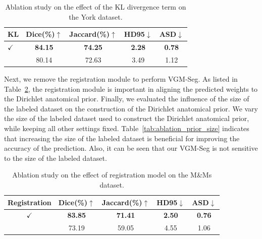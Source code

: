 \documentclass[preprint,12pt]{elsarticle}
\begin{document}
\begin{table}[htbp]
  \centering
  \caption{Ablation study on the effect of the KL divergence term on the York dataset.}
  \begin{tabular}{l c c c c}
    \toprule
    	KL & Dice(\%)$\uparrow$ & Jaccard(\%)$\uparrow$ & HD95$\downarrow$ & ASD$\downarrow$ \\
    \midrule
    $\checkmark$ & \textbf{84.15} & \textbf{74.25} & \textbf{2.28} & \textbf{0.78} \\
      & 80.14 & 72.63 & 3.49 & 1.12 \\
    \bottomrule
  \end{tabular}
  \label{tab:ablation_KL}
\end{table}

Next, we remove the registration module to perform VGM-Seg. As listed in Table~\ref{tab:ablation_components}, the registration module is important in aligning the predicted weights to the Dirichlet anatomical prior.
Finally, we evaluated the influence of the size of the labeled dataset on the construction of the Dirichlet anatomical prior.
We vary the size of the labeled dataset used to construct the Dirichlet anatomical prior, while keeping all other settings fixed. Table~\ref{tab:ablation_prior_size} indicates that increasing the size of the labeled dataset is beneficial for improving the accuracy of the prediction. Also, it can be seen that our VGM-Seg is not sensitive to the size of the labeled dataset.

\begin{table}[htbp]
  \centering
  \caption{Ablation study on the effect of registration model on the M\&Ms dataset.}
  \begin{tabular}{c c c c c}
    \toprule
		Registration &  Dice(\%)$\uparrow$ & Jaccard(\%)$\uparrow$ & HD95$\downarrow$ & ASD$\downarrow$ \\
    \midrule
    $\checkmark$ & \textbf{83.85} & \textbf{71.41}  & \textbf{2.50} & \textbf{0.76} \\
     & 73.19 & 59.05 & 4.55 & 1.06 \\
    \bottomrule
  \end{tabular}
  \label{tab:ablation_components}
\end{table}
\end{document}
